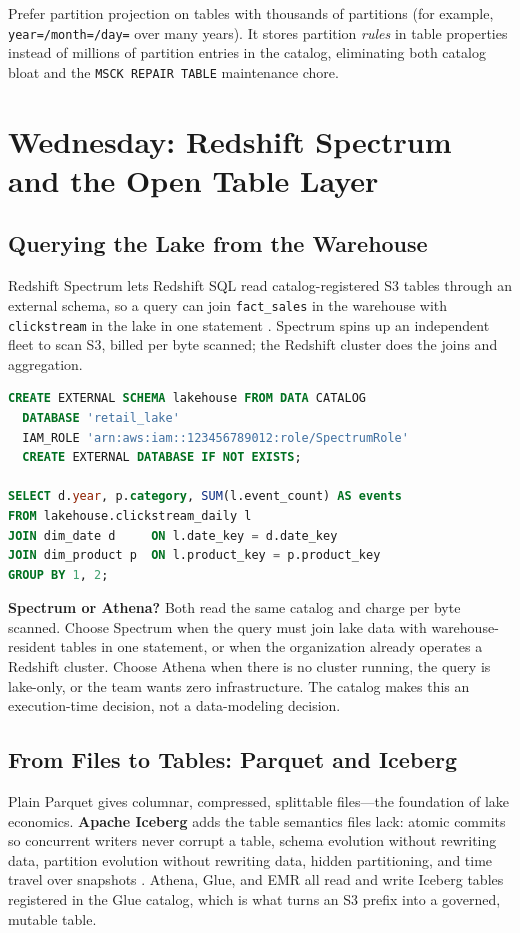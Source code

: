 \begin{tipbox}
Prefer partition projection on tables with thousands of partitions (for example, \texttt{year=/month=/day=} over many years). It stores partition \emph{rules} in table properties instead of millions of partition entries in the catalog, eliminating both catalog bloat and the \texttt{MSCK REPAIR TABLE} maintenance chore.
\end{tipbox}

\section{Wednesday: Redshift Spectrum and the Open Table Layer}
\subsection{Querying the Lake from the Warehouse}
Redshift Spectrum lets Redshift SQL read catalog-registered S3 tables through an external schema, so a query can join \texttt{fact\_sales} in the warehouse with \texttt{clickstream} in the lake in one statement \cite{awsRedshiftSpectrumDocs}. Spectrum spins up an independent fleet to scan S3, billed per byte scanned; the Redshift cluster does the joins and aggregation.

\begin{lstlisting}[language=SQL,caption={Creating a Spectrum external schema over the Glue catalog.},label={lst:ch7-external-schema}]
CREATE EXTERNAL SCHEMA lakehouse FROM DATA CATALOG
  DATABASE 'retail_lake'
  IAM_ROLE 'arn:aws:iam::123456789012:role/SpectrumRole'
  CREATE EXTERNAL DATABASE IF NOT EXISTS;

SELECT d.year, p.category, SUM(l.event_count) AS events
FROM lakehouse.clickstream_daily l
JOIN dim_date d     ON l.date_key = d.date_key
JOIN dim_product p  ON l.product_key = p.product_key
GROUP BY 1, 2;
\end{lstlisting}

\textbf{Spectrum or Athena?} Both read the same catalog and charge per byte scanned. Choose Spectrum when the query must join lake data with warehouse-resident tables in one statement, or when the organization already operates a Redshift cluster. Choose Athena when there is no cluster running, the query is lake-only, or the team wants zero infrastructure. The catalog makes this an execution-time decision, not a data-modeling decision.

\subsection{From Files to Tables: Parquet and Iceberg}
Plain Parquet gives columnar, compressed, splittable files---the foundation of lake economics. \textbf{Apache Iceberg} adds the table semantics files lack: atomic commits so concurrent writers never corrupt a table, schema evolution without rewriting data, partition evolution without rewriting data, hidden partitioning, and time travel over snapshots \cite{apacheIceberg}. Athena, Glue, and EMR all read and write Iceberg tables registered in the Glue catalog, which is what turns an S3 prefix into a governed, mutable table.


